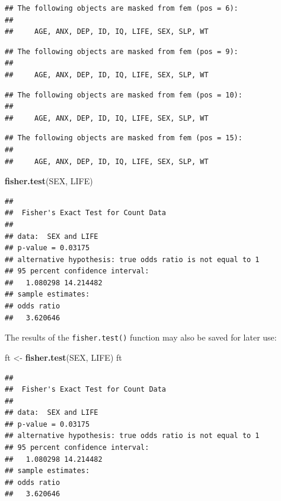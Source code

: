 \documentclass[12pt,]{book}
\newenvironment{Shaded}{\begin{snugshade}}{\end{snugshade}}
\newcommand{\KeywordTok}[1]{\textcolor[rgb]{0.13,0.29,0.53}{\textbf{#1}}}
\newcommand{\StringTok}[1]{\textcolor[rgb]{0.31,0.60,0.02}{#1}}
\newcommand{\NormalTok}[1]{#1}
\theoremstyle{definition}
\theoremstyle{definition}
\theoremstyle{definition}
\theoremstyle{remark}
\begin{document}
\begin{verbatim}
## The following objects are masked from fem (pos = 6):
## 
##     AGE, ANX, DEP, ID, IQ, LIFE, SEX, SLP, WT
\end{verbatim}

\begin{verbatim}
## The following objects are masked from fem (pos = 9):
## 
##     AGE, ANX, DEP, ID, IQ, LIFE, SEX, SLP, WT
\end{verbatim}

\begin{verbatim}
## The following objects are masked from fem (pos = 10):
## 
##     AGE, ANX, DEP, ID, IQ, LIFE, SEX, SLP, WT
\end{verbatim}

\begin{verbatim}
## The following objects are masked from fem (pos = 15):
## 
##     AGE, ANX, DEP, ID, IQ, LIFE, SEX, SLP, WT
\end{verbatim}

\begin{Shaded}
\begin{Highlighting}[]
\KeywordTok{fisher.test}\NormalTok{(SEX, LIFE)}
\end{Highlighting}
\end{Shaded}

\begin{verbatim}
## 
##  Fisher's Exact Test for Count Data
## 
## data:  SEX and LIFE
## p-value = 0.03175
## alternative hypothesis: true odds ratio is not equal to 1
## 95 percent confidence interval:
##   1.080298 14.214482
## sample estimates:
## odds ratio 
##   3.620646
\end{verbatim}

The results of the \texttt{fisher.test()} function may also be saved for
later use:

\begin{Shaded}
\begin{Highlighting}[]
\NormalTok{ft <-}\StringTok{ }\KeywordTok{fisher.test}\NormalTok{(SEX, LIFE)}
\NormalTok{ft}
\end{Highlighting}
\end{Shaded}

\begin{verbatim}
## 
##  Fisher's Exact Test for Count Data
## 
## data:  SEX and LIFE
## p-value = 0.03175
## alternative hypothesis: true odds ratio is not equal to 1
## 95 percent confidence interval:
##   1.080298 14.214482
## sample estimates:
## odds ratio 
##   3.620646
\end{verbatim}
\end{document}
